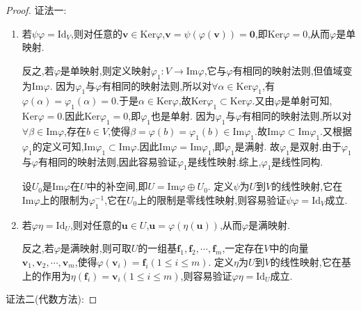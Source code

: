 \documentclass[../../main.tex]{subfiles}%
\begin{document}
\begin{proof}

{\color{blue}证法一:}
\begin{enumerate}[(1)]
\item 若\(\psi\varphi = \text{Id}_V\),则对任意的\(\boldsymbol{v}\in\text{Ker}\varphi\),\(\boldsymbol{v}=\psi(\varphi(\boldsymbol{v})) = \boldsymbol{0}\),即\(\text{Ker}\varphi = 0\),从而\(\varphi\)是单映射. 

反之,若\(\varphi\)是单映射,则定义映射\(\varphi_1:V\to\text{Im}\varphi\),它与\(\varphi\)有相同的映射法则,但值域变为\(\text{Im}\varphi\). 
因为\(\varphi_1\)与\(\varphi\)有相同的映射法则,所以对\(\forall \alpha \in \mathrm{Ker}\varphi_1\),有\(\varphi(\alpha)=\varphi_1(\alpha)=0\).于是\(\alpha \in \mathrm{Ker}\varphi\),故\(\mathrm{Ker}\varphi_1\subset \mathrm{Ker}\varphi\).又由\(\varphi\)是单射可知,\(\mathrm{Ker}\varphi = 0\).因此\(\mathrm{Ker}\varphi_1 = 0\),即\(\varphi_1\)也是单射.
因为\(\varphi_1\)与\(\varphi\)有相同的映射法则,所以对\(\forall \beta \in \mathrm{Im}\varphi\),存在\(b \in V\),使得\(\beta = \varphi(b)=\varphi_1(b) \in \mathrm{Im}\varphi_1\).故\(\mathrm{Im}\varphi\subset \mathrm{Im}\varphi_1\).又根据\(\varphi_1\)的定义可知,\(\mathrm{Im}\varphi_1\subset \mathrm{Im}\varphi\).因此\(\mathrm{Im}\varphi = \mathrm{Im}\varphi_1\),即\(\varphi_1\)是满射.
故\(\varphi_1\)是双射.由于\(\varphi_1\)与\(\varphi\)有相同的映射法则,因此容易验证\(\varphi_1\)是线性映射.综上,\(\varphi_1\)是线性同构.

设\(U_0\)是\(\text{Im}\varphi\)在\(U\)中的补空间,即\(U = \text{Im}\varphi\oplus U_0\). 定义\(\psi\)为\(U\)到\(V\)的线性映射,它在\(\text{Im}\varphi\)上的限制为\(\varphi_1^{-1}\),它在\(U_0\)上的限制是零线性映射,则容易验证\(\psi\varphi = \text{Id}_V\)成立.

\item 若\(\varphi\eta = \text{Id}_U\),则对任意的\(\boldsymbol{u}\in U\),\(\boldsymbol{u}=\varphi(\eta(\boldsymbol{u}))\),从而\(\varphi\)是满映射. 

反之,若\(\varphi\)是满映射,则可取\(U\)的一组基\(\boldsymbol{f}_1,\boldsymbol{f}_2,\cdots,\boldsymbol{f}_m\),一定存在\(V\)中的向量\(\boldsymbol{v}_1,\boldsymbol{v}_2,\cdots,\boldsymbol{v}_m\),使得\(\varphi(\boldsymbol{v}_i)=\boldsymbol{f}_i(1\leqslant  i\leqslant  m)\). 定义\(\eta\)为\(U\)到\(V\)的线性映射,它在基上的作用为\(\eta(\boldsymbol{f}_i)=\boldsymbol{v}_i(1\leqslant  i\leqslant  m)\),则容易验证\(\varphi\eta = \text{Id}_U\)成立.
\end{enumerate}
{\color{blue}证法二(代数方法):}


\end{proof}
\end{document}
